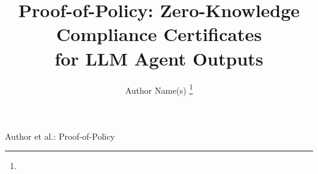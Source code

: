 \documentclass[10pt,journal,compsoc]{IEEEtran}
\newcommand{\need}[1]{}
\newcommand{\need}[1]{\textcolor{blue}{[[ NEED: #1 ]]}}
\begin{document}
\title{Proof-of-Policy: Zero-Knowledge Compliance Certificates\\ for LLM Agent Outputs}

%
{Author et al.: Proof-of-Policy}

\author{Author Name(s)%
\thanks{\need{BLOCKER (author metadata): author names, affiliations, funding
acknowledgements, and manuscript dates.}}}
\maketitle
\end{document}
